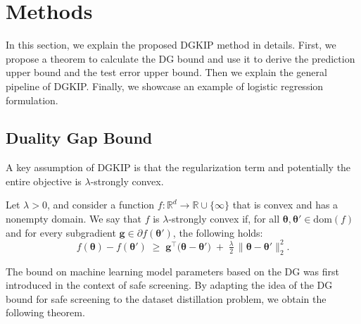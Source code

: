\section{Methods}
\label{Methods}
In this section, we explain the proposed DGKIP method in details. First, we propose a theorem to calculate the DG bound and use it to derive the prediction upper bound and the test error upper bound. Then we explain the general pipeline of DGKIP. Finally, we showcase an example of logistic regression formulation.

\subsection{Duality Gap Bound}
\label{duality_gap_bound}

A key assumption of DGKIP is that the regularization term and potentially the entire objective is \(\lambda\)-strongly convex. 
\begin{definition}
  Let \(\lambda > 0\), and consider a function
  \(f: \mathbb{R}^d \to \mathbb{R} \cup \{\infty\}\) that is convex and has a nonempty domain.
  We say that \(f\) is \(\lambda\)-strongly convex if, for all
  \(\boldsymbol{\theta}, \boldsymbol{\theta}' \in \mathrm{dom}(f)\) and for every
  subgradient \(\boldsymbol{g} \in \partial f(\boldsymbol{\theta}')\), the following holds:
  \[
    f(\boldsymbol{\theta}) - f(\boldsymbol{\theta}') 
    \;\ge\;
    \boldsymbol{g}^\top \!\bigl(\boldsymbol{\theta} - \boldsymbol{\theta}'\bigr) 
    \;+\; \tfrac{\lambda}{2}\,\|\boldsymbol{\theta} - \boldsymbol{\theta}'\|_2^2.
  \]
  \end{definition}
  


The bound on machine learning model parameters based on the DG was first introduced in the context of safe screening. By adapting the idea of the DG bound for safe screening \cite{shibagaki2016simultaneous} to the dataset distillation problem, we obtain the following theorem.

